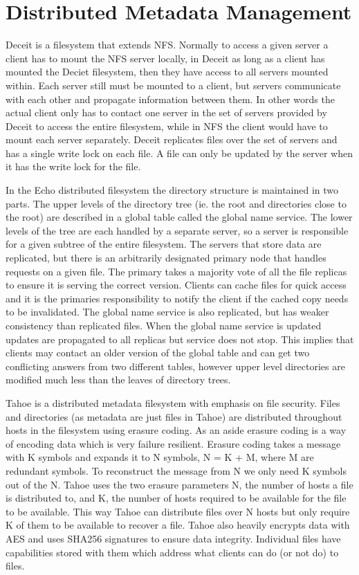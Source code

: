 \section{Distributed Metadata Management}


Deceit \cite{Siegel1990} is a filesystem that extends NFS. Normally to access
a given server a client has to mount the NFS server locally, in Deceit as long
as a client has mounted the Deciet filesystem, then they have access to all
servers mounted within. Each server still must be mounted to a client, but
servers communicate with each other and propagate information between them. In
other words the actual client only has to contact one server in the set of
servers provided by Deceit to access the entire filesystem, while in NFS the
client would have to mount each server separately. Deceit replicates files
over the set of servers and has a single write lock on each file. A file can
only be updated by the server when it has the write lock for the file.


In the Echo \cite{Hisgen1989} distributed filesystem the directory structure
is maintained in two parts. The upper levels of the directory tree (ie. the
root and directories close to the root) are described in a global table called
the global name service. The lower levels of the tree are each handled by a
separate server, so a server is responsible for a given subtree of the entire
filesystem. The servers that store data are replicated, but there is an
arbitrarily designated primary node that handles requests on a given file. The
primary takes a majority vote of all the file replicas to ensure it is serving
the correct version. Clients can cache files for quick access and it is the
primaries responsibility to notify the client if the cached copy needs to be
invalidated. The global name service is also replicated, but has weaker
consistency than replicated files. When the global name service is updated
updates are propagated to all replicas but service does not stop. This implies
that clients may contact an older version of the global table and can get two
conflicting answers from two different tables, however upper level directories
are modified much less than the leaves of directory trees.


Tahoe \cite{Wilcox-O'Hearn2008} is a distributed metadata filesystem with
emphasis on file security. Files and directories (as metadata are just files
in Tahoe) are distributed throughout hosts in the filesystem using erasure
coding. As an aside erasure coding is a way of encoding data which is very
failure resilient. Erasure coding takes a message with K symbols and expands
it to N symbols, N = K + M, where M are redundant symbols. To reconstruct the
message from N we only need K symbols out of the N.  Tahoe uses the two
erasure parameters N, the number of hosts a file is distributed to, and K, the
number of hosts required to be available for the file to be available. This
way Tahoe can distribute files over N hosts but only require K of them to be
available to recover a file. Tahoe also heavily encrypts data with AES and
uses SHA256 signatures to ensure data integrity. Individual files have
capabilities stored with them which address what clients can do (or not do) to
files.


